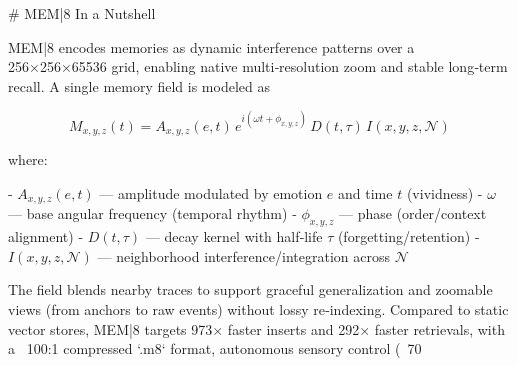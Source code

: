 # MEM|8 In a Nutshell

MEM|8 encodes memories as dynamic interference patterns over a 256×256×65536 grid, enabling native multi‑resolution zoom and stable long‑term recall. A single memory field is modeled as

\[\displaystyle
M_{x,y,z}(t) = A_{x,y,z}(e,t)\, e^{i(\omega t + \phi_{x,y,z})}\, D(t,\tau)\, I(x,y,z,\mathcal{N})
\]

where:

- $A_{x,y,z}(e,t)$ — amplitude modulated by emotion $e$ and time $t$ (vividness)
- $\omega$ — base angular frequency (temporal rhythm)
- $\phi_{x,y,z}$ — phase (order/context alignment)
- $D(t,\tau)$ — decay kernel with half‑life $\tau$ (forgetting/retention)
- $I(x,y,z,\mathcal{N})$ — neighborhood interference/integration across $\mathcal{N}$

The field blends nearby traces to support graceful generalization and zoomable views (from anchors to raw events) without lossy re‑indexing. Compared to static vector stores, MEM|8 targets 973× faster inserts and 292× faster retrievals, with a ~100:1 compressed `.m8` format, autonomous sensory control (~70%